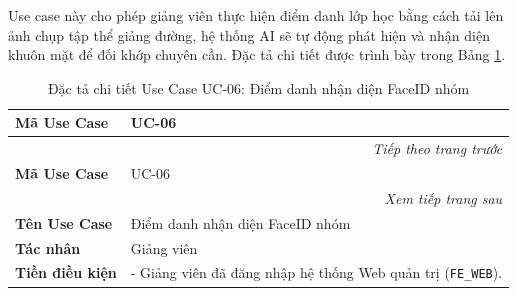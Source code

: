 \documentclass[../DoAn.tex]{subfiles}
\begin{document}
\label{subsection:spec_uc_06}

Use case này cho phép giảng viên thực hiện điểm danh lớp học bằng cách tải lên ảnh chụp tập thể giảng đường, hệ thống AI sẽ tự động phát hiện và nhận diện khuôn mặt để đối khớp chuyên cần. Đặc tả chi tiết được trình bày trong Bảng \ref{table:spec_uc_06}.

\begin{longtable}{|p{2.8cm}|p{0.8cm}|p{2.2cm}|p{7.5cm}|}
    \caption{Đặc tả chi tiết Use Case UC-06: Điểm danh nhận diện FaceID nhóm}
    \label{table:spec_uc_06} \\
    \hline
    \textbf{Mã Use Case} & \multicolumn{3}{l|}{UC-06} \\ \hline
    \endfirsthead
    \multicolumn{4}{r}{\textit{Tiếp theo trang trước}} \\
    \hline
    \textbf{Mã Use Case} & \multicolumn{3}{l|}{UC-06} \\ \hline
    \endhead
    \hline
    \multicolumn{4}{r}{\textit{Xem tiếp trang sau}} \\
    \endfoot
    \hline
    \endlastfoot
    \textbf{Tên Use Case} & \multicolumn{3}{l|}{Điểm danh nhận diện FaceID nhóm} \\ \hline
    \textbf{Tác nhân} & \multicolumn{3}{l|}{Giảng viên} \\ \hline
    \textbf{Tiền điều kiện} & \multicolumn{3}{p{10.9cm}|}{- Giảng viên đã đăng nhập hệ thống Web quản trị (\mbox{\texttt{FE\_WEB}}). 

}
\end{longtable}
\end{document}
